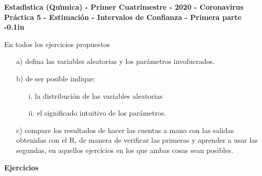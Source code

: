 \documentclass[11pt,a4paper,twoside]{article}%
\begin{document}
\begin{center}
\textbf{\textsf{Estad\'{\i}stica (Qu\'{\i}mica) - Primer Cuatrimestre - 2020 - Coronavirus}}\\

\textbf{Pr\'{a}ctica 5 - Estimaci\'{o}n - Intervalos de Confianza - Primera parte\vspace
{-0.1in}}
\bigskip

\end{center}

En todos los ejercicios propuestos

\begin{enumerate}
\item[a)] defina las variables aleatorias y los par\'{a}metros involucrados.

\item[b)] de ser posible indique:

\begin{enumerate}
\item[i.] la distribuci\'{o}n de las variables aleatorias

\item[ii.] el significado intuitivo de los par\'{a}metros.
\end{enumerate}

\item[c)] compare los resultados de hacer las cuentas a mano con las salidas
obtenidas con el R, de manera de verificar las primeras y aprender a usar las
segundas, en aquellos ejercicios en los que ambas cosas sean posibles.
\end{enumerate}

\bigskip

{\bf Ejercicios}
\end{document}
